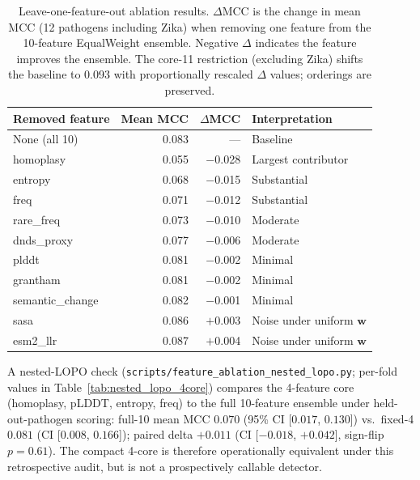\begin{table}[htbp]
\centering
\caption{Leave-one-feature-out ablation results. $\Delta$MCC is the change in mean MCC (12 pathogens including Zika) when removing one feature from the 10-feature EqualWeight ensemble. Negative $\Delta$ indicates the feature improves the ensemble. The core-11 restriction (excluding Zika) shifts the baseline to 0.093 with proportionally rescaled $\Delta$ values; orderings are preserved.}
\label{tab:feature_ablation}
\footnotesize
\begin{tabular}{lrrl}
\toprule
\textbf{Removed feature} & \textbf{Mean MCC} & $\Delta$\textbf{MCC} & \textbf{Interpretation} \\
\midrule
None (all 10)       & 0.083 & ---     & Baseline \\
\midrule
homoplasy           & 0.055 & $-$0.028 & Largest contributor \\
entropy             & 0.068 & $-$0.015 & Substantial \\
freq                & 0.071 & $-$0.012 & Substantial \\
rare\_freq          & 0.073 & $-$0.010 & Moderate \\
dnds\_proxy         & 0.077 & $-$0.006 & Moderate \\
plddt               & 0.081 & $-$0.002 & Minimal \\
grantham            & 0.081 & $-$0.002 & Minimal \\
semantic\_change    & 0.082 & $-$0.001 & Minimal \\
sasa                & 0.086 & $+$0.003 & Noise under uniform $\mathbf{w}$ \\
esm2\_llr           & 0.087 & $+$0.004 & Noise under uniform $\mathbf{w}$ \\
\bottomrule
\end{tabular}
\end{table}

A nested-LOPO check (\texttt{scripts/feature\_ablation\_nested\_lopo.py}; per-fold values in Table~\ref{tab:nested_lopo_4core}) compares the 4-feature core (homoplasy, pLDDT, entropy, freq) to the full 10-feature ensemble under held-out-pathogen scoring: full-10 mean MCC $0.070$ (95\% CI [$0.017$, $0.130$]) vs.\ fixed-4 $0.081$ (CI [$0.008$, $0.166$]); paired delta $+0.011$ (CI [$-0.018$, $+0.042$], sign-flip $p=0.61$). The compact 4-core is therefore operationally equivalent under this retrospective audit, but is not a prospectively callable detector.

